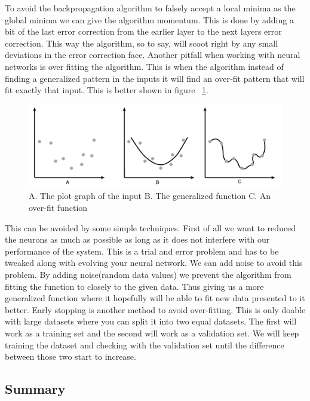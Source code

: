 To avoid the backpropagation algorithm to falsely accept a local minima as the global minima we can give the algorithm momentum. This is done by adding a bit of the last error correction from the earlier layer to the next layers error correction. This way the algorithm, so to say, will scoot right by any small deviations in the error correction face.
\newline
Another pitfall when working with neural networks is over fitting the algorithm. This is when the algorithm instead of finding a generalized pattern in the inputs it will find an over-fit pattern that will fit exactly that input. This is better shown in figure ~\ref{fig:overfitting}.
\begin{figure}[h!]
\centering
\includegraphics[width=0.8\linewidth,natwidth=1262,natheight=415]{billeder/overfitting.png}
\caption{A. The plot graph of the input B. The generalized function C. An over-fit function}
\label{fig:overfitting}
\end{figure}
This can be avoided by some simple techniques. First of all we want to reduced the neurons as much as possible as long as it does not interfere with our performance of the system. This is a trial and error problem and has to be tweaked along with evolving your neural network. We can add noise to avoid this problem. By adding noise(random data values) we prevent the algorithm from fitting the function to closely to the given data. Thus giving us a more generalized function where it hopefully will be able to fit new data presented to it better. Early stopping is another method to avoid over-fitting. This is only doable with large datasets where you can split it into two equal datasets. The first will work as a training set and the second will work as a validation set. We will keep training the dataset and checking with the validation set until the difference between those two start to increase.

\subsection{Summary}

